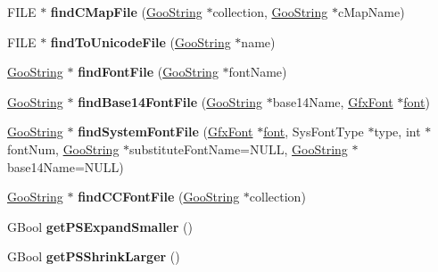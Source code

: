 \begin{DoxyCompactItemize}
F\+I\+LE $\ast$ {\bfseries find\+C\+Map\+File} (\hyperlink{class_goo_string}{Goo\+String} $\ast$collection, \hyperlink{class_goo_string}{Goo\+String} $\ast$c\+Map\+Name)
\item 
\mbox{\label{class_global_params_a2b6a712aee455870ea21bd2fb34eddb5}} 
F\+I\+LE $\ast$ {\bfseries find\+To\+Unicode\+File} (\hyperlink{class_goo_string}{Goo\+String} $\ast$name)
\item 
\mbox{\label{class_global_params_ad85604971b2272a9a36c7bf47dee93ab}} 
\hyperlink{class_goo_string}{Goo\+String} $\ast$ {\bfseries find\+Font\+File} (\hyperlink{class_goo_string}{Goo\+String} $\ast$font\+Name)
\item 
\mbox{\label{class_global_params_ab3ae477a8e42292c550a3c835a3048ab}} 
\hyperlink{class_goo_string}{Goo\+String} $\ast$ {\bfseries find\+Base14\+Font\+File} (\hyperlink{class_goo_string}{Goo\+String} $\ast$base14\+Name, \hyperlink{class_gfx_font}{Gfx\+Font} $\ast$\hyperlink{structfont}{font})
\item 
\mbox{\label{class_global_params_a167cb787fdf2ec032381178a60dbe12f}} 
\hyperlink{class_goo_string}{Goo\+String} $\ast$ {\bfseries find\+System\+Font\+File} (\hyperlink{class_gfx_font}{Gfx\+Font} $\ast$\hyperlink{structfont}{font}, Sys\+Font\+Type $\ast$type, int $\ast$font\+Num, \hyperlink{class_goo_string}{Goo\+String} $\ast$substitute\+Font\+Name=N\+U\+LL, \hyperlink{class_goo_string}{Goo\+String} $\ast$base14\+Name=N\+U\+LL)
\item 
\mbox{\label{class_global_params_aa4e41141e4fa4df97dad3d49117bdf22}} 
\hyperlink{class_goo_string}{Goo\+String} $\ast$ {\bfseries find\+C\+C\+Font\+File} (\hyperlink{class_goo_string}{Goo\+String} $\ast$collection)
\item 
\mbox{\label{class_global_params_af322474c7ca595070c77f72a6b31608d}} 
G\+Bool {\bfseries get\+P\+S\+Expand\+Smaller} ()
\item 
\mbox{\label{class_global_params_ad901f5ad2716c9570eb6d631265f58cb}} 
G\+Bool {\bfseries get\+P\+S\+Shrink\+Larger} ()
\item 
\mbox{\label{class_global_params_a49be84e85d66dc95f4d23c7de58ef3f8}} 

\end{DoxyCompactItemize}
